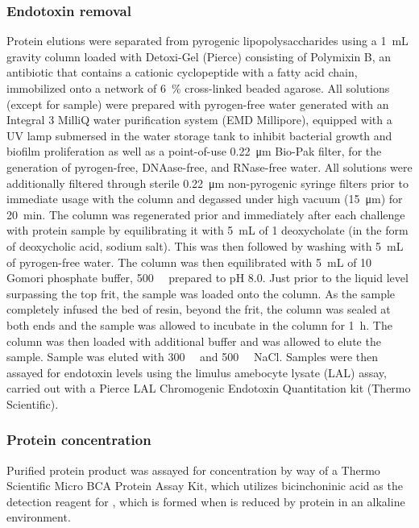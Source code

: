 \begin{refsection}
\subsubsection{Endotoxin removal}

Protein elutions were separated from pyrogenic lipopolysaccharides using a
\SI{1}{\mL} gravity column loaded with Detoxi-Gel (Pierce) consisting of
Polymixin B, an antibiotic that contains a cationic cyclopeptide with a fatty
acid chain, immobilized onto a network of \SI{6}{\percent} cross-linked beaded
agarose. All solutions (except for sample) were prepared with pyrogen-free water
generated with an Integral 3 MilliQ water purification system (EMD Millipore),
equipped with a UV lamp submersed in the water storage tank to inhibit bacterial
growth and biofilm proliferation as well as a point-of-use \SI{0.22}{\um}
Bio-Pak filter, for the generation of pyrogen-free, DNAase-free, and RNase-free
water. All solutions were additionally filtered through sterile \SI{0.22}{\um}
non-pyrogenic syringe filters prior to immediate usage with the column and
degassed under high vacuum (\SI{15}{\um}) for \SI{20}{\minute}. The column was
regenerated prior and immediately after each challenge with protein sample by
equilibrating it with \SI{5}{\mL} of \SI{1}{\wtper} deoxycholate (in the form of
deoxycholic acid, sodium salt). This was then followed by washing with
\SI{5}{\mL} of pyrogen-free water. The column was then equilibrated with
\SI{5}{\mL} of \SI{10}{\milli\moLar} Gomori phosphate buffer,
\SI{500}{\milli\moLar}  prepared to pH 8.0. Just prior to the liquid
level surpassing the top frit, the sample was loaded onto the column. As the
sample completely infused the bed of resin, beyond the frit, the column was
sealed at both ends and the sample was allowed to incubate in the column for
\SI{1}{\hour}. The column was then loaded with additional buffer and was allowed
to elute the sample. Sample was eluted with \SI{300}{\milli\moLar} and
\SI{500}{\milli\moLar} NaCl. Samples were then assayed for endotoxin levels
using the limulus amebocyte lysate (LAL) assay, carried out with a Pierce LAL
Chromogenic Endotoxin Quantitation kit (Thermo Scientific).

\subsubsection{Protein concentration}
Purified protein product was assayed for concentration by way of a Thermo
Scientific Micro BCA Protein Assay Kit, which utilizes bicinchoninic acid as the
detection reagent for , which is formed when  is reduced by
protein in an alkaline environment.\cite{Smith1985}


\end{refsection}
